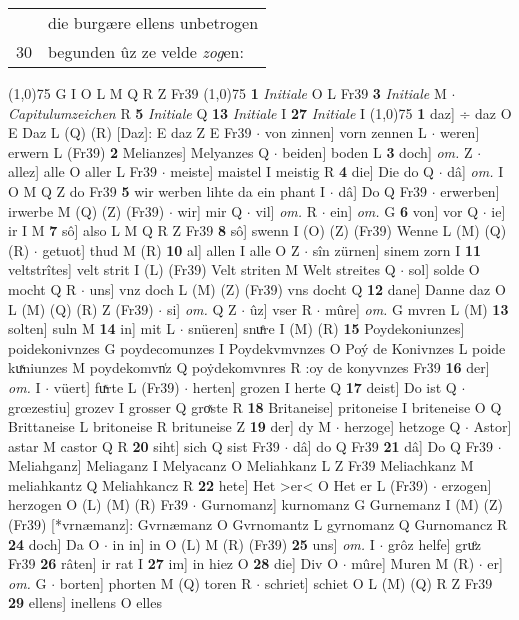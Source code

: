 \documentclass[8pt,a4paper,notitlepage]{article}
\begin{document}
\begin{table}[ht]
\begin{minipage}[t]{0.5\linewidth}
\begin{tabular}{rl}
 & die burgære ellens unbetrogen\\ 
30 & begunden ûz ze velde \textit{zog}en:\\ 
\end{tabular}
\scriptsize
\line(1,0){75} \newline
G I O L M Q R Z Fr39 \newline
\line(1,0){75} \newline
\textbf{1} \textit{Initiale} O L Fr39  \textbf{3} \textit{Initiale} M   $\cdot$ \textit{Capitulumzeichen} R  \textbf{5} \textit{Initiale} Q  \textbf{13} \textit{Initiale} I  \textbf{27} \textit{Initiale} I  \newline
\line(1,0){75} \newline
\textbf{1} daz] ÷ daz O E Daz L (Q) (R) [Daz]: E daz  Z E Fr39  $\cdot$ von zinnen] vorn zennen L  $\cdot$ weren] erwern L (Fr39) \textbf{2} Melianzes] Melyanzes Q  $\cdot$ beiden] boden L \textbf{3} doch] \textit{om.} Z  $\cdot$ allez] alle O aller L Fr39  $\cdot$ meiste] maistel I meistig R \textbf{4} die] Die do Q  $\cdot$ dâ] \textit{om.} I O M Q Z do Fr39 \textbf{5} wir werben lihte da ein phant I  $\cdot$ dâ] Do Q Fr39  $\cdot$ erwerben] irwerbe M (Q) (Z) (Fr39)  $\cdot$ wir] mir Q  $\cdot$ vil] \textit{om.} R  $\cdot$ ein] \textit{om.} G \textbf{6} von] vor Q  $\cdot$ ie] ir I M \textbf{7} sô] also L M Q R Z Fr39 \textbf{8} sô] swenn I (O) (Z) (Fr39) Wenne L (M) (Q) (R)  $\cdot$ getuot] thud M (R) \textbf{10} al] allen I alle O Z  $\cdot$ sîn zürnen] sinem zorn I \textbf{11} veltstrîtes] velt strit I (L) (Fr39) Velt striten M Welt streites Q  $\cdot$ sol] solde O mocht Q R  $\cdot$ uns] vnz doch L (M) (Z) (Fr39) vns docht Q \textbf{12} dane] Danne daz O L (M) (Q) (R) Z (Fr39)  $\cdot$ si] \textit{om.} Q Z  $\cdot$ ûz] vser R  $\cdot$ mûre] \textit{om.} G mvren L (M) \textbf{13} solten] suln M \textbf{14} in] mit L  $\cdot$ snüeren] snuͤre I (M) (R) \textbf{15} Poydekoniunzes] poidekonivnzes G poydecomunzes I Poydekvmvnzes O Poý de Konivnzes L poide kuͯniunzes M poydekomvn͑z Q poẏdekomvnres R :oy de konyvnzes Fr39 \textbf{16} der] \textit{om.} I  $\cdot$ vüert] fuͯrte L (Fr39)  $\cdot$ herten] grozen I herte Q \textbf{17} deist] Do ist Q  $\cdot$ grœzestiu] grozev I grosser Q groͯste R \textbf{18} Britaneise] pritoneise I briteneise O Q Brittaneise L britoneise R brituneise Z \textbf{19} der] dy M  $\cdot$ herzoge] hetzoge Q  $\cdot$ Astor] astar M castor Q R \textbf{20} siht] sich Q sist Fr39  $\cdot$ dâ] do Q Fr39 \textbf{21} dâ] Do Q Fr39  $\cdot$ Meliahganz] Meliaganz I Melyacanz O Meliahkanz L Z Fr39 Meliachkanz M meliahkantz Q Meliahkancz R \textbf{22} hete] Het >er< O Het er L (Fr39)  $\cdot$ erzogen] herzogen O (L) (M) (R) Fr39  $\cdot$ Gurnomanz] kurnomanz G Gurnemanz I (M) (Z) (Fr39) [*vrnæmanz]: Gvrnæmanz  O Gvrnomantz L gyrnomanz Q Gurnomancz R \textbf{24} doch] Da O  $\cdot$ in in] in O (L) M (R) (Fr39) \textbf{25} uns] \textit{om.} I  $\cdot$ grôz helfe] gruͦz Fr39 \textbf{26} râten] ir rat I \textbf{27} im] in hiez O \textbf{28} die] Div O  $\cdot$ mûre] Muren M (R)  $\cdot$ er] \textit{om.} G  $\cdot$ borten] phorten M (Q) toren R  $\cdot$ schriet] schiet O L (M) (Q) R Z Fr39 \textbf{29} ellens] inellens O elles 
\end{minipage}
\end{table}
\end{document}

